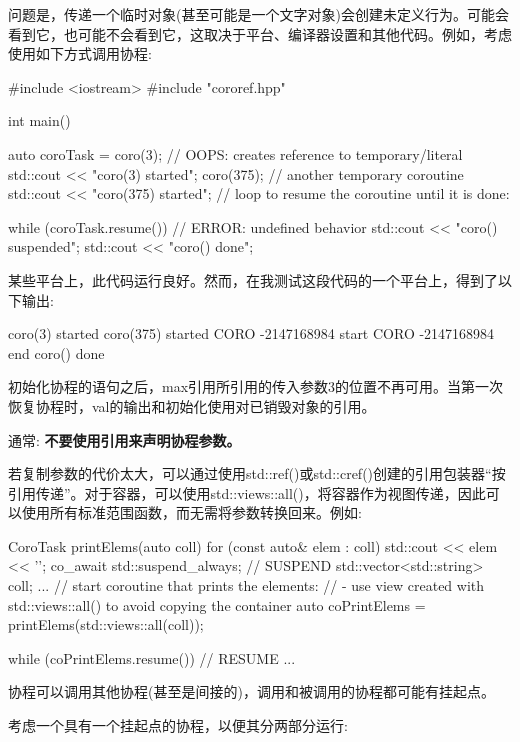 问题是，传递一个临时对象(甚至可能是一个文字对象)会创建未定义行为。可能会看到它，也可能不会看到它，这取决于平台、编译器设置和其他代码。例如，考虑使用如下方式调用协程:


\begin{cpp}
#include <iostream>
#include "cororef.hpp"

int main()
{
	auto coroTask = coro(3); // OOPS: creates reference to temporary/literal
	std::cout << "coro(3) started\n";
	coro(375); // another temporary coroutine
	std::cout << "coro(375) started\n";
	// loop to resume the coroutine until it is done:

	while (coroTask.resume()) { // ERROR: undefined behavior
		std::cout << "coro() suspended\n";
	}
	std::cout << "coro() done\n";
}
\end{cpp}

某些平台上，此代码运行良好。然而，在我测试这段代码的一个平台上，得到了以下输出:

\begin{shell}
coro(3) started
coro(375) started
  CORO -2147168984 start
  CORO -2147168984 end
coro() done
\end{shell}

初始化协程的语句之后，max引用所引用的传入参数3的位置不再可用。当第一次恢复协程时，val的输出和初始化使用对已销毁对象的引用。

通常: \textbf{不要使用引用来声明协程参数。}

若复制参数的代价太大，可以通过使用std::ref()或std::cref()创建的引用包装器“按引用传递”。对于容器，可以使用std::views::all()，将容器作为视图传递，因此可以使用所有标准范围函数，而无需将参数转换回来。例如:

\begin{cpp}
CoroTask printElems(auto coll)
{
	for (const auto& elem : coll) {
		std::cout << elem << '\n';
		co_await std::suspend_always{}; // SUSPEND
	}
}
std::vector<std::string> coll;
...
// start coroutine that prints the elements:
// - use view created with std::views::all() to avoid copying the container
auto coPrintElems = printElems(std::views::all(coll));

while (coPrintElems.resume()) { // RESUME
...
}
\end{cpp}


协程可以调用其他协程(甚至是间接的)，调用和被调用的协程都可能有挂起点。

考虑一个具有一个挂起点的协程，以便其分两部分运行:

